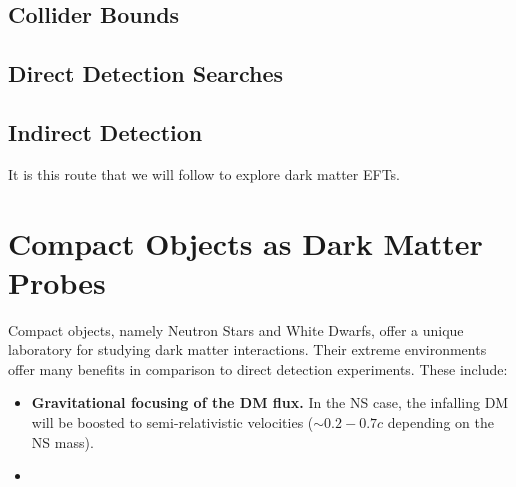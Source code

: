   \subsection{Collider Bounds}

  \subsection{Direct Detection Searches}

  \subsection{Indirect Detection}


  It is this route that we will follow to explore dark matter EFTs.

  \section{Compact Objects as Dark Matter Probes}


  Compact objects, namely Neutron Stars and White Dwarfs, offer a unique
  laboratory for studying dark matter interactions. Their extreme environments
  offer many benefits in comparison to direct detection experiments. 
  These include:

  \begin{itemize}
    \item \textbf{Gravitational focusing of the DM flux.} In the NS case, the 
    infalling DM will be boosted to semi-relativistic velocities ($\sim 0.2 - 0.7 c$
    depending on the NS mass).
    \item 
  \end{itemize}
  

  




  